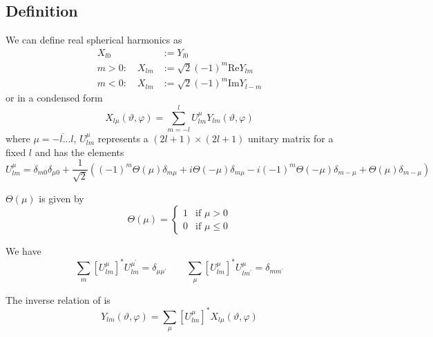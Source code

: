 \subsection{Definition}
\par{We can define real spherical harmonics as}
\begin{equation}
\begin{split}
X_{l0}&:=Y_{l0}\\ m>0:\quad
X_{lm}&:=\sqrt{2}(-1)^m\text{Re}Y_{lm}\\m<0:\quad X_{lm}&:=\sqrt{2}(-1)^m\text{Im}Y_{l-m}
\end{split}\end{equation}
or in a condensed form
\begin{equation}
\label{Rspherdef}
X_{l\mu}(\vartheta,\varphi)=\sum_{m=-l}^{l}U_{lm}^{\mu}Y_{lm}(\vartheta,\varphi)
\end{equation}
where $\mu=\overline{-l...l}$, $U_{lm}^{\mu}$ represents a $(2l+1)\times (2l+1)$
unitary matrix for a fixed $l$ and has the
elements
\begin{equation}
U_{lm}^{\mu}=\delta_{m0}\delta_{\mu 0}+\frac{1}{\sqrt{2}}\left((-1)^m
  \Theta(\mu)\delta_{m\mu}+i\Theta(-\mu)\delta_{m\mu}-i(-1)^m \Theta(-\mu)\delta_{m-\mu}+\Theta(\mu)\delta_{m-\mu}\right)
\end{equation}
\par{$\Theta(\mu)$} is given by
\begin{equation}
\Theta(\mu)=\left\{\begin{array}{ll}
1&\textrm{if \(\mu>0\)}\\
0&\textrm{if \(\mu \le 0\)}
\end{array}\right.
\end{equation}
%
\par{We have}
\begin{equation}
\label{unit}
\sum_{m}[U_{lm}^{\mu}]^{*}U_{lm}^{\mu^{\prime}}=\delta_{\mu \mu^{\prime}}\qquad\sum_{\mu}[U_{lm}^{\mu}]^{*}U_{lm^{\prime}}^{\mu}=\delta_{m m^{\prime}}
\end{equation}
\par{The inverse relation of  is}
\begin{equation}
Y_{lm}(\vartheta,\varphi)=\sum_{\mu}[U_{lm}^{\mu}]^{*}X_{l\mu}(\vartheta,\varphi)
\end{equation}
